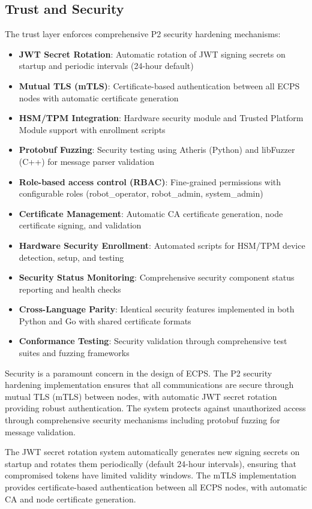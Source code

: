 \documentclass[12pt]{article}
\begin{document}
\subsection{Trust and Security}
The trust layer enforces comprehensive P2 security hardening mechanisms:
\begin{itemize}
  \item \textbf{JWT Secret Rotation}: Automatic rotation of JWT signing secrets on startup and periodic intervals (24-hour default)
  \item \textbf{Mutual TLS (mTLS)}: Certificate-based authentication between all ECPS nodes with automatic certificate generation
  \item \textbf{HSM/TPM Integration}: Hardware security module and Trusted Platform Module support with enrollment scripts
  \item \textbf{Protobuf Fuzzing}: Security testing using Atheris (Python) and libFuzzer (C++) for message parser validation
  \item \textbf{Role-based access control (RBAC)}: Fine-grained permissions with configurable roles (robot\_operator, robot\_admin, system\_admin)
  \item \textbf{Certificate Management}: Automatic CA certificate generation, node certificate signing, and validation
  \item \textbf{Hardware Security Enrollment}: Automated scripts for HSM/TPM device detection, setup, and testing
  \item \textbf{Security Status Monitoring}: Comprehensive security component status reporting and health checks
  \item \textbf{Cross-Language Parity}: Identical security features implemented in both Python and Go with shared certificate formats
  \item \textbf{Conformance Testing}: Security validation through comprehensive test suites and fuzzing frameworks
\end{itemize}

Security is a paramount concern in the design of ECPS. The P2 security hardening implementation ensures that all communications are secure through mutual TLS (mTLS) between nodes, with automatic JWT secret rotation providing robust authentication. The system protects against unauthorized access through comprehensive security mechanisms including protobuf fuzzing for message validation.

The JWT secret rotation system automatically generates new signing secrets on startup and rotates them periodically (default 24-hour intervals), ensuring that compromised tokens have limited validity windows. The mTLS implementation provides certificate-based authentication between all ECPS nodes, with automatic CA and node certificate generation.
\end{document}
